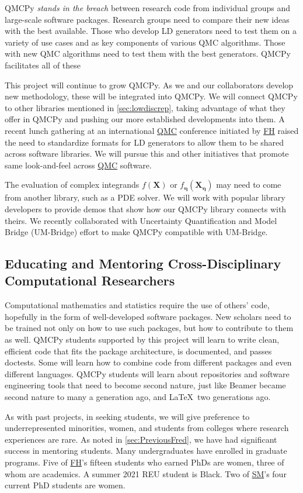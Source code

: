 \documentclass[11pt]{NSFamsart}
\newcommand{\cmtS}[1]{{\color{blue}{(Simon: #1)}}}
\newcommand{\FH}{\hyperlink{FHlink}{FH}\xspace}
\newcommand{\SM}{\hyperlink{SMlink}{SM}\xspace}
\newcommand{\QMC}{\hyperlink{QMClink}{QMC}\xspace}
\newcommand{\QMCPy}{QMCPy\xspace}
\newcommand{\fidparam}{\bldeta}
\newcommand{\bX}{{\boldsymbol{X}}}
\newcommand{\bldeta}{{\boldsymbol{\eta}}}
\begin{document}
QMCPy  \emph{stands in the breach} between research code from individual groups and large-scale software packages.  Research groups need to compare their new ideas with the best available.  Those who develop LD generators need to test them on a variety of use cases and as key components of various QMC algorithms.  Those with new QMC algorithms need to test them with the best generators.  \QMCPy facilitates all of these

This project will continue to grow \QMCPy.  As we and our collaborators develop new methodology, these will be integrated into \QMCPy.  We will connect \QMCPy to other libraries mentioned in \cref{sec:lowdiscrep}, taking advantage of what they offer in \QMCPy and pushing our more established developments into them.  A recent lunch gathering at an international \QMC conference initiated by \FH raised the need to standardize formats for LD generators to allow them to be shared across software libraries.  We will pursue this and other initiatives that promote same look-and-feel across \QMC software.

The evaluation of complex integrands $f(\bX)$ or $f_{\fidparam}(\bX_{\fidparam})$ may need to come from another  library, such as a PDE solver.  We will work with popular library developers to provide demos that show  how our \QMCPy library connects with theirs.  We recently collaborated with Uncertainty Quantification and Model Bridge (UM-Bridge) effort \cite{umbridge} to make \QMCPy compatible with UM-Bridge.


\subsection{Educating and Mentoring Cross-Disciplinary Computational Researchers}
Computational mathematics and statistics require the use of others' code, hopefully in the form of well-developed software packages.  New scholars need to be trained not only on how to use such packages, but how to contribute to them as well.  QMCPy students supported by this project will learn to write clean, efficient code that fits the package architecture, is documented, and passes doctests.  Some will learn how to combine code from different packages and even different languages.  QMCPy students will learn about repositories and software engineering tools that need to become second nature, just like Beamer became second nature to many a generation ago, and \LaTeX\ two generations ago.

\cmtS{may need to buff up a bit on DEI (I think this was a comment in prior reviews): } As with past projects, in seeking students, we will give preference to underrepresented minorities, women, and students from colleges where research experiences are rare.  As noted in \cref{sec:PreviousFred}, we have had significant success in mentoring students.  Many undergraduates have enrolled in graduate programs.  Five of \FH's fifteen students who earned PhDs are women, three of whom are academics. A  summer 2021 REU student is Black.  Two of \SM's four current PhD students are women.  
\end{document}
